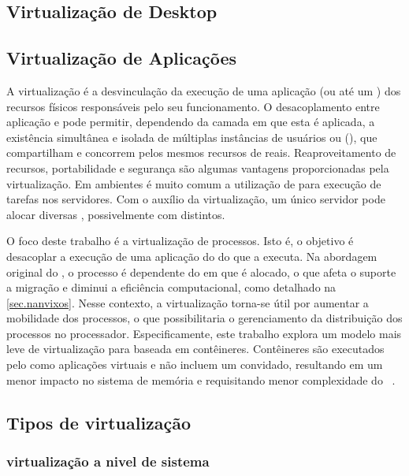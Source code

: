 \subsection{Virtualização de Desktop}

\subsection{Virtualização de Aplicações}



A virtualização é a desvinculação da execução de uma aplicação (ou até um \so) dos recursos físicos responsáveis pelo seu funcionamento. O desacoplamento entre aplicação e \hardware pode permitir, dependendo da camada em que esta é aplicada, a existência simultânea e isolada de múltiplas instâncias de usuários ou \oss (\vms), que compartilham e concorrem pelos mesmos recursos de \hardware reais. Reaproveitamento de recursos, portabilidade e segurança são algumas vantagens proporcionadas pela virtualização.
%
Em ambientes \cloud é muito comum a utilização de \vms para execução de tarefas nos servidores. Com o auxílio da virtualização, um único servidor pode alocar diversas \vms, possivelmente com \oss distintos. 

O foco deste trabalho é a virtualização de processos. Isto é, o objetivo é desacoplar a execução de uma aplicação do \cluster do \lw que a executa. Na abordagem original do \nanvix, o processo é dependente do \cluster em que é alocado, o que afeta o suporte a migração e diminui a eficiência computacional, como detalhado na \autoref{sec.nanvixos}. Nesse contexto, a virtualização torna-se útil por aumentar a mobilidade dos processos, o que possibilitaria o gerenciamento da distribuição dos processos no processador. Especificamente, este trabalho explora um modelo mais leve de virtualização para \lws baseada em contêineres. Contêineres são executados pelo \os como aplicações virtuais e não incluem um \os convidado, resultando em um menor impacto no sistema de memória e requisitando menor complexidade do \hardware~\cite{thalheim2018cntr, sharma2016containers}.


\subsection{Tipos de virtualização}


\subsubsection{virtualização a nivel de sistema}


